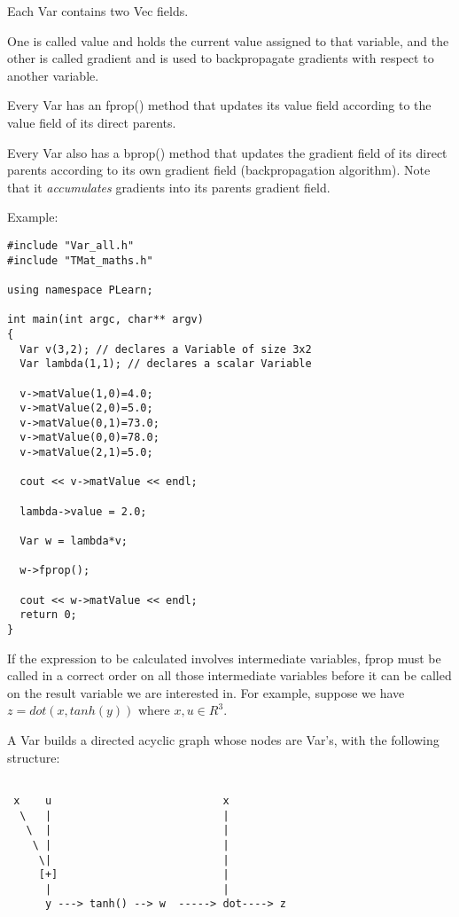 \documentclass[11pt]{book}
\begin{document}
 Each Var contains two Vec fields. 
 
 One is called value and holds the current value assigned to that variable, and the other is called gradient and is used to backpropagate gradients with respect to another variable.
 
 Every Var has an fprop() method that updates its value field according to the value field of its direct parents.
 
 Every Var also has a bprop() method that updates the gradient field of its direct parents according to its own gradient field (backpropagation algorithm). Note that it \emph{accumulates} gradients into its parents gradient field. 

 Example: 
 
\begin{verbatim}
#include "Var_all.h"
#include "TMat_maths.h"

using namespace PLearn;

int main(int argc, char** argv)
{
  Var v(3,2); // declares a Variable of size 3x2
  Var lambda(1,1); // declares a scalar Variable

  v->matValue(1,0)=4.0;
  v->matValue(2,0)=5.0;
  v->matValue(0,1)=73.0;
  v->matValue(0,0)=78.0;
  v->matValue(2,1)=5.0;

  cout << v->matValue << endl;

  lambda->value = 2.0;

  Var w = lambda*v;

  w->fprop();

  cout << w->matValue << endl;
  return 0;
}
\end{verbatim}


 If the expression to be calculated involves intermediate variables, fprop must be called in a correct order on all those intermediate variables before it can be called on the result variable we are interested in. For example, suppose we have $z=dot(x,tanh(y))$ where $x,u \in R^3$.

 
 A Var builds a directed acyclic graph whose nodes are Var's, with the following structure: 
\nopagebreak
\begin{verbatim}

 x    u                           x
  \   |                           |   
   \  |                           |  
    \ |                           |  
     \|                           |  
     [+]                          |
      |                           |           
      y ---> tanh() --> w  -----> dot----> z

\end{verbatim}
\end{document}

